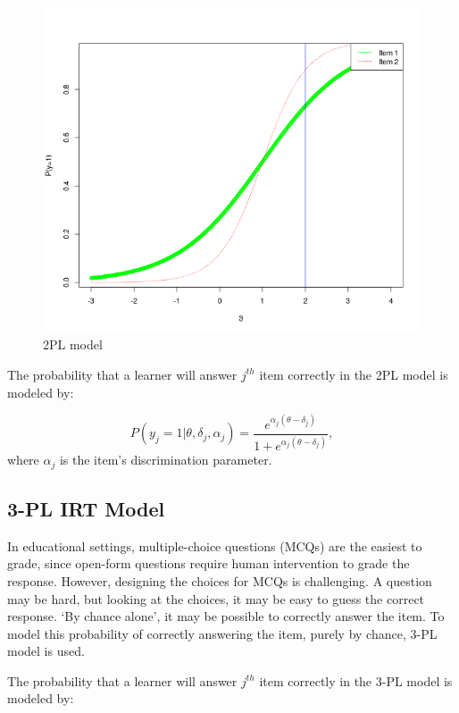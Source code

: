 \documentclass[12pt]{article}
\begin{document}
\begin{figure}[t]
    \includegraphics[scale=0.5]{Plots/2pl.png}
    \centering
    \caption{2PL model}
    \label{fig:2pl}
\end{figure}

The probability that a learner will answer $j^{th}$ item correctly in the 2PL model is modeled by:

\begin{equation}\label{eq:2pl}
    P(y_j=1|\theta, \delta_j, \alpha_j) = \frac{e^{\alpha_j(\theta - \delta_j)}}{1+e^{\alpha_j(\theta - \delta_j)}},
\end{equation}
where $\alpha_j$ is the item's discrimination parameter.

\subsection{3-PL IRT Model}
In educational settings, multiple-choice questions (MCQs) are the easiest to grade, since open-form questions require human intervention to grade the response. However, designing the choices for MCQs is challenging. A question may be hard, but looking at the choices, it may be easy to guess the correct response. `By chance alone', it may be possible to correctly answer the item. To model this probability of correctly answering the item, purely by chance, 3-PL model is used.

The probability that a learner will answer $j^{th}$ item correctly in the 3-PL model is modeled by:
\end{document}
